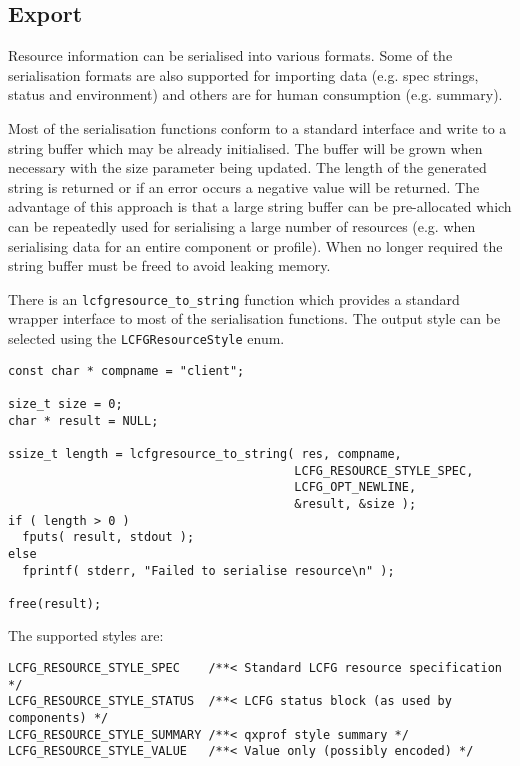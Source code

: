 \documentclass[11pt,a4paper,titlepage]{article}
\begin{document}
\subsection{Export}

Resource information can be serialised into various formats. Some of
the serialisation formats are also supported for importing data
(e.g. spec strings, status and environment) and others are for human
consumption (e.g. summary).

Most of the serialisation functions conform to a standard interface
and write to a string buffer which may be already initialised. The
buffer will be grown when necessary with the size parameter being
updated. The length of the generated string is returned or if an error
occurs a negative value will be returned. The advantage of this
approach is that a large string buffer can be pre-allocated which can
be repeatedly used for serialising a large number of resources
(e.g. when serialising data for an entire component or profile). When
no longer required the string buffer must be freed to avoid leaking
memory.

There is an \texttt{lcfgresource\_to\_string} function which provides
a standard wrapper interface to most of the serialisation
functions. The output style can be selected using the
\texttt{LCFGResourceStyle} enum.

\begin{verbatim}
const char * compname = "client";

size_t size = 0;
char * result = NULL;

ssize_t length = lcfgresource_to_string( res, compname,
                                        LCFG_RESOURCE_STYLE_SPEC,
                                        LCFG_OPT_NEWLINE,
                                        &result, &size );
if ( length > 0 )
  fputs( result, stdout );
else
  fprintf( stderr, "Failed to serialise resource\n" );

free(result);
\end{verbatim}

The supported styles are:

\begin{verbatim}
LCFG_RESOURCE_STYLE_SPEC    /**< Standard LCFG resource specification */
LCFG_RESOURCE_STYLE_STATUS  /**< LCFG status block (as used by components) */
LCFG_RESOURCE_STYLE_SUMMARY /**< qxprof style summary */
LCFG_RESOURCE_STYLE_VALUE   /**< Value only (possibly encoded) */
\end{verbatim}
\end{document}
